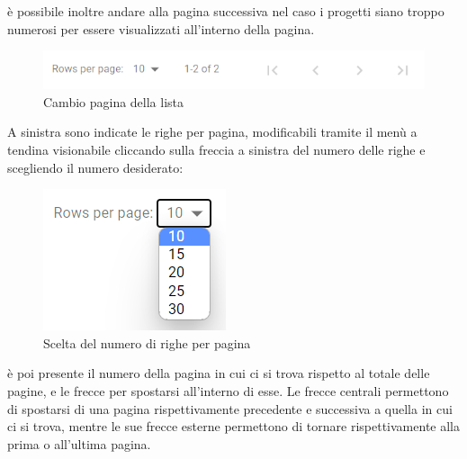 \documentclass{article}
\begin{document}
 è possibile inoltre andare alla pagina successiva nel caso i progetti siano troppo numerosi per essere visualizzati all'interno della pagina. 
    \begin{figure}[H]
      \centering
      \includegraphics[width=\textwidth]{documenti/Screenshot manuale utente/cambio pagina.png}
      \caption{Cambio pagina della lista}
      \label{paginalista}
    \end{figure} 
    A sinistra sono indicate le righe per pagina, modificabili tramite il menù a tendina visionabile cliccando sulla freccia a sinistra del numero delle righe e scegliendo il numero desiderato:
        \begin{figure}[H]
      \centering
      \includegraphics{documenti/Screenshot manuale utente/scelta righe per pagina.png}
      \caption{Scelta del numero di righe per pagina}
      \label{nrighepad}
    \end{figure} 
    è poi presente il numero della pagina in cui ci si trova rispetto al totale delle pagine, e le frecce per spostarsi all'interno di esse. Le frecce centrali permettono di spostarsi di una pagina rispettivamente precedente e successiva a quella in cui ci si trova, mentre le sue frecce esterne permettono di tornare rispettivamente alla prima o all'ultima pagina.
\end{document}
